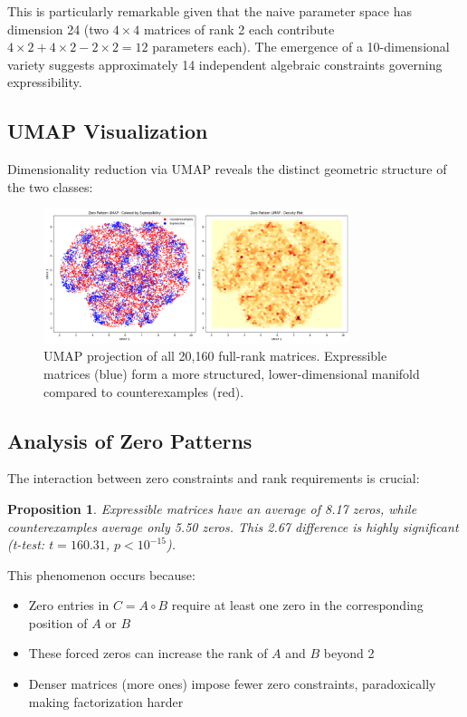 \documentclass[11pt]{amsart}
\theoremstyle{plain}
\newtheorem{proposition}[theorem]{Proposition}
\theoremstyle{definition}
\theoremstyle{remark}
\begin{document}
This is particularly remarkable given that the naive parameter space has dimension 24 (two $4 \times 4$ matrices of rank 2 each contribute $4 \times 2 + 4 \times 2 - 2 \times 2 = 12$ parameters each). The emergence of a 10-dimensional variety suggests approximately 14 independent algebraic constraints governing expressibility.

\subsection{UMAP Visualization}

Dimensionality reduction via UMAP reveals the distinct geometric structure of the two classes:

\begin{figure}[H]
\centering
\includegraphics[width=0.8\textwidth]{umap.png}
\caption{UMAP projection of all 20,160 full-rank matrices. Expressible matrices (blue) form a more structured, lower-dimensional manifold compared to counterexamples (red).}
\end{figure}

\subsection{Analysis of Zero Patterns}

The interaction between zero constraints and rank requirements is crucial:

\begin{proposition}
Expressible matrices have an average of 8.17 zeros, while counterexamples average only 5.50 zeros. This 2.67 difference is highly significant (t-test: $t = 160.31$, $p < 10^{-15}$).
\end{proposition}

This phenomenon occurs because:
\begin{itemize}
\item Zero entries in $C = A \circ B$ require at least one zero in the corresponding position of $A$ or $B$
\item These forced zeros can increase the rank of $A$ and $B$ beyond 2
\item Denser matrices (more ones) impose fewer zero constraints, paradoxically making factorization harder
\end{itemize}
\end{document}
